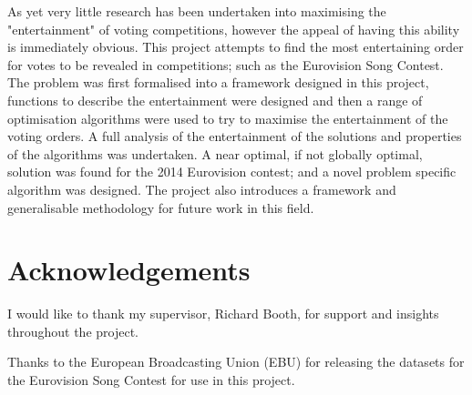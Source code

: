 \documentclass[12pt]{report}
\begin{document}

As yet very little research has been undertaken into maximising the "entertainment" of voting competitions, however the appeal of having this ability is immediately obvious. This project attempts to find the most entertaining order for votes to be revealed in competitions; such as the Eurovision Song Contest. The problem was first formalised into a framework designed in this project, functions to describe the entertainment were designed and then a range of optimisation algorithms were used to try to maximise the entertainment of the voting orders. A full analysis of the entertainment of the solutions and properties of the algorithms was undertaken. A near optimal, if not globally optimal, solution was found for the 2014 Eurovision contest; and a novel problem specific algorithm was designed. The project also introduces a framework and generalisable methodology for future work in this field.

\section*{Acknowledgements}
I would like to thank my supervisor, Richard Booth, for support and insights throughout the project.

Thanks to the European Broadcasting Union (EBU) for releasing the datasets for the Eurovision Song Contest for use in this project.

\tableofcontents %
\listoffigures
\listoftables
\clearpage %

\end{document}
